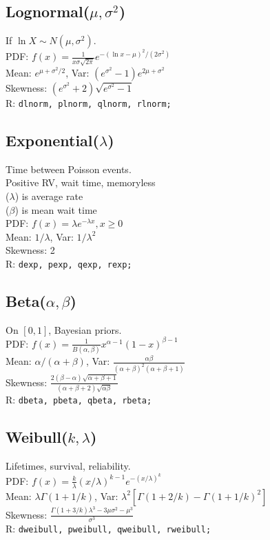 \documentclass[7pt,landscape]{article}
\begin{document}
\begin{multicols}{3}
\subsection*{Lognormal($\mu,\sigma^2$)}
If $\ln X \sim N(\mu,\sigma^2)$. \\
PDF: $f(x)=\tfrac{1}{x\sigma\sqrt{2\pi}} e^{-(\ln x-\mu)^2/(2\sigma^2)}$ \\
Mean: $e^{\mu+\sigma^2/2}$, Var: $(e^{\sigma^2}-1)e^{2\mu+\sigma^2}$ \\
Skewness: $(e^{\sigma^2}+2)\sqrt{e^{\sigma^2}-1}$ \\
R: \texttt{dlnorm, plnorm, qlnorm, rlnorm;} \\

\subsection*{Exponential($\lambda$)}
Time between Poisson events. \\
Positive RV, wait time, memoryless \\
($\lambda$) is average rate \\
($\beta$) is mean wait time \\
PDF: $f(x)=\lambda e^{-\lambda x}, x\ge0$ \\
Mean: $1/\lambda$, Var: $1/\lambda^2$ \\
Skewness: 2 \\
R: \texttt{dexp, pexp, qexp, rexp;} \\

\subsection*{Beta($\alpha,\beta$)}
On $[0,1]$, Bayesian priors. \\
PDF: $f(x)=\tfrac{1}{B(\alpha,\beta)} x^{\alpha-1}(1-x)^{\beta-1}$ \\
Mean: $\alpha/(\alpha+\beta)$, Var: $\tfrac{\alpha\beta}{(\alpha+\beta)^2(\alpha+\beta+1)}$ \\
Skewness: $\frac{2(\beta-\alpha)\sqrt{\alpha+\beta+1}}{(\alpha+\beta+2)\sqrt{\alpha\beta}}$ \\
R: \texttt{dbeta, pbeta, qbeta, rbeta;} \\

\subsection*{Weibull($k,\lambda$)}
Lifetimes, survival, reliability. \\
PDF: $f(x)=\tfrac{k}{\lambda}(x/\lambda)^{k-1} e^{-(x/\lambda)^k}$ \\
Mean: $\lambda \Gamma(1+1/k)$, Var: $\lambda^2[\Gamma(1+2/k)-\Gamma(1+1/k)^2]$ \\
Skewness: $\frac{\Gamma(1+3/k)\lambda^3 - 3\mu\sigma^2 - \mu^3}{\sigma^3}$ \\
R: \texttt{dweibull, pweibull, qweibull, rweibull;} \\


\end{multicols}
\end{document}
